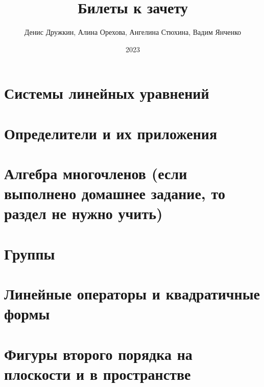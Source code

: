 \documentclass{Exams}
\author{Денис Дружкин, Алина Орехова, Ангелина Стюхина, Вадим Янченко}
\title{Билеты к зачету}
\date{2023}
\begin{document}
\subject{Алгем}
\ExamMakeTitle
\section{Системы линейных уравнений}


\section{Определители и их приложения}


\section {Алгебра многочленов (если выполнено домашнее задание, то раздел не нужно учить)}


\section{Группы}


\section{Линейные операторы и квадратичные формы}


\section{Фигуры второго порядка на плоскости и в пространстве}

\end{document}
